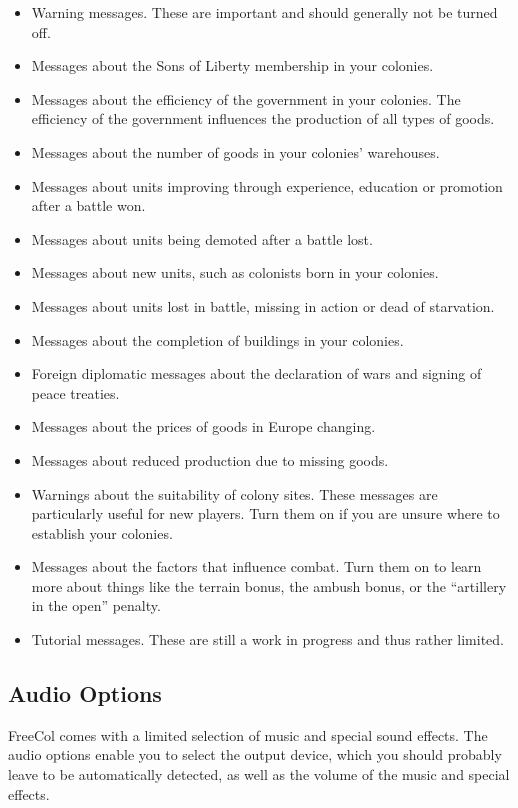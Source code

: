 \documentclass[12pt]{book}
\begin{document}
\begin{itemize}
\item Warning messages. These are important and should generally not
be turned off.
\item Messages about the Sons of Liberty membership in your colonies.
\item Messages about the efficiency of the government in your
colonies. The efficiency of the government influences the production
of all types of goods.
\item Messages about the number of goods in your colonies'
warehouses. 
\item Messages about units improving through experience, education or
promotion after a battle won.
\item Messages about units being demoted after a battle lost.
\item Messages about new units, such as colonists born in your
colonies.
\item Messages about units lost in battle, missing in action or dead
of starvation.
\item Messages about the completion of buildings in your colonies.
\item Foreign diplomatic messages about the declaration of wars and
signing of peace treaties.
\item Messages about the prices of goods in Europe changing.
\item Messages about reduced production due to missing goods.
\item Warnings about the suitability of colony sites. These messages
  are particularly useful for new players. Turn them on if you are
  unsure where to establish your colonies.
\item Messages about the factors that influence combat. Turn them on
to learn more about things like the terrain bonus, the ambush bonus,
or the ``artillery in the open'' penalty.
\item Tutorial messages. These are still a work in progress and thus
  rather limited.
\end{itemize}

\hypertarget{audio options}{\subsection{Audio Options}}

FreeCol comes with a limited selection of music and special sound
effects. The audio options enable you to select the output device,
which you should probably leave to be automatically detected, as well
as the volume of the music and special effects.
\end{document}
